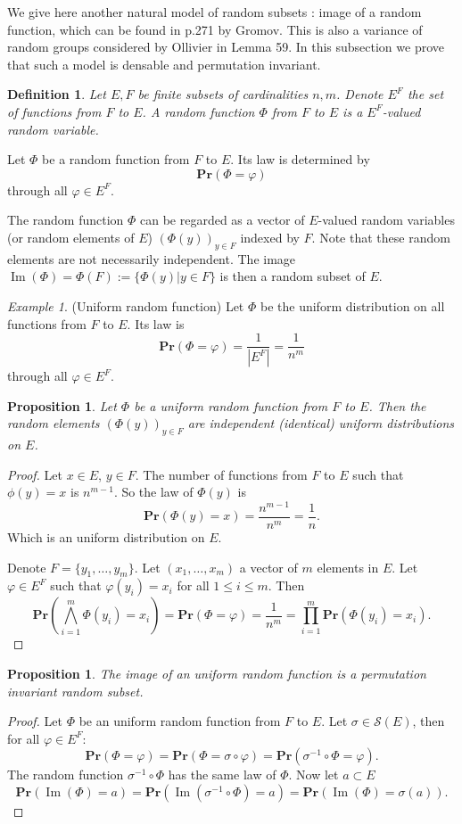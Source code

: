 \documentclass{article}
\DeclareMathOperator{\im}{Im}
\newcommand{\moinsun}{^{-1}}
\def\Pr{\mathbf{Pr}}
\newtheorem{defi}[thm]{Definition}
\newtheorem{prop}[thm]{Proposition}
\theoremstyle{remark}
\newtheorem{ex}[thm]{Example}
\begin{document}
We give here another natural model of random subsets : image of a random function, which can be found in \cite{Gro93} p.271 by Gromov. This is also a variance of random groups considered by Ollivier in \cite{Oll05} Lemma 59. In this subsection we prove that such a model is densable and permutation invariant.

\begin{defi} Let $E,F$ be finite subsets of cardinalities $n,m$. Denote $E^F$ the set of functions from $F$ to $E$. A random function $\Phi$ from $F$ to $E$ is a $E^F$-valued random variable.
\end{defi}

Let $\Phi$ be a random function from $F$ to $E$. Its law is determined by \[\Pr(\Phi = \varphi)\] through all $\varphi\in E^F$.

The random function $\Phi$ can be regarded as a vector of $E$-valued random variables (or random elements of $E$) $(\Phi(y))_{y\in F}$ indexed by $F$. Note that these random elements are not necessarily independent. The image $\im(\Phi) = \Phi(F):=\{\Phi(y)|y\in F\}$ is then a random subset of $E$.

\begin{ex} (Uniform random function) Let $\Phi$ be the uniform distribution on all functions from $F$ to $E$. Its law is
\[\Pr(\Phi = \varphi) = \frac{1}{|E^F|} = \frac{1}{n^m}\]
through all $\varphi\in E^F.$
\end{ex}

\begin{prop} Let $\Phi$ be a uniform random function from $F$ to $E$. Then the random elements $(\Phi(y))_{y\in F}$ are independent (identical) uniform distributions on $E$.
\end{prop}
\begin{proof}
    Let $x\in E$, $y\in F$. The number of functions from $F$ to $E$ such that $\phi(y) = x$ is $n^{m-1}$. So the law of $\Phi(y)$ is 
    \[\Pr(\Phi(y) = x) = \frac{n^{m-1}}{n^m} = \frac{1}{n}.\]
    Which is an uniform distribution on $E$.
    
    Denote $F = \{y_1,\dots,y_m\}$. Let $(x_1,\dots,x_m)$ a vector of $m$ elements in $E$. Let $\varphi\in E^F$ such that $\varphi(y_i) = x_i$ for all $1\leq i \leq m$. Then 
    \[\Pr\left(\bigwedge\limits_{i=1}^m\Phi(y_i) = x_i\right) = \Pr(\Phi = \varphi) =  \frac{1}{n^m} = \prod_{i=1}^m \Pr(\Phi(y_i) = x_i).\]
\end{proof}\quad

\begin{prop} The image of an uniform random function is a permutation invariant random subset.
\end{prop}
\begin{proof}
    Let $\Phi$ be an uniform random function from $F$ to $E$. Let $\sigma\in \mathcal{S}(E)$, then for all $\varphi\in E^F$:
    \[\Pr(\Phi = \varphi) = \Pr(\Phi = \sigma\circ\varphi) = \Pr(\sigma\moinsun\circ\Phi = \varphi).\]
    The random function $\sigma\moinsun\circ\Phi$ has the same law of $\Phi$. Now let $a\subset E$
    \[\Pr(\im(\Phi) = a) =\Pr(\im(\sigma\moinsun\circ\Phi) = a) =\Pr(\im(\Phi) = \sigma(a)).\]
\end{proof}
\end{document}
